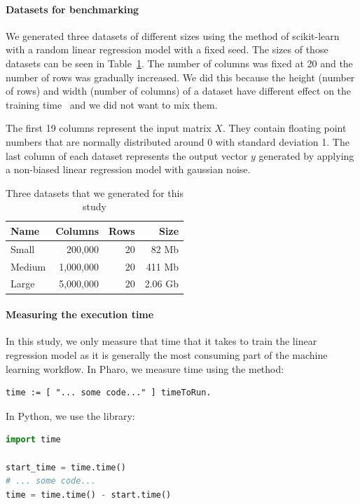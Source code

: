 \documentclass[]{ceurart}
\begin{document}
\paragraph{Datasets for benchmarking}
We generated three datasets of different sizes using the  method of scikit-learn with a random linear regression model with a fixed seed.
The sizes of those datasets can be seen in Table~\ref{tab:Datasets}.
The number of columns was fixed at 20 and the number of rows was gradually increased.
We did this because the height (number of rows) and width (number of columns) of a dataset have different effect on the training time~\cite{Gero19a} and we did not want to mix them.

The first 19 columns represent the input matrix $X$.
They contain floating point numbers that are normally distributed around 0 with standard deviation 1.
The last column of each dataset represents the output vector $y$ generated by applying a non-biased linear regression model with gaussian noise.

\begin{table}[htbp]
\centering
\caption{Three datasets that we generated for this study}
\begin{tabular}{lrrr}
\hline
\textbf{Name} & \textbf{Columns} & \textbf{Rows} & \textbf{Size} \\
\hline
Small & 200,000 & 20 & 82 Mb \\
Medium & 1,000,000 & 20 & 411 Mb \\
Large & 5,000,000 & 20 & 2.06 Gb \\
\hline
\end{tabular}
\label{tab:Datasets}
\end{table}

\paragraph{Measuring the execution time}
In this study, we only measure that time that it takes to train the linear regression model as it is generally the most consuming part of the machine learning workflow.
In Pharo, we measure time using the  method:

\begin{lstlisting}[language=Smalltalk]
time := [ "... some code..." ] timeToRun.
\end{lstlisting}

In Python, we use the  library:

\begin{lstlisting}[language=Python]
import time

start_time = time.time()
# ... some code...
time = time.time() - start.time()
\end{lstlisting}
\end{document}
